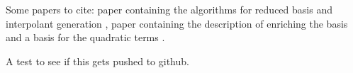 Some papers to cite: paper containing the algorithms for reduced basis and interpolant generation
\citep{Field_2014}, paper containing the description of enriching the basis and a basis for the quadratic terms
\citep{2016arXiv160408253S}.

A test to see if this gets pushed to github.